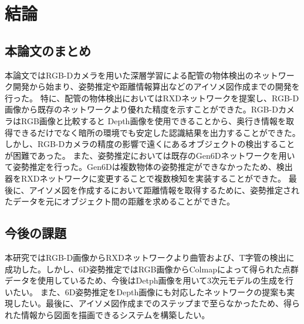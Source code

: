 ﻿\chapter{%
結論}

\section{本論文のまとめ}
本論文ではRGB-Dカメラを用いた深層学習による配管の物体検出のネットワーク開発から始まり、姿勢推定や距離情報算出などのアイソメ図作成までの開発を行った。
特に、配管の物体検出においてはRXDネットワークを提案し、RGB-D画像から既存のネットワークより優れた精度を示すことができた。RGB-DカメラはRGB画像と比較すると
Depth画像を使用できることから、奥行き情報を取得できるだけでなく暗所の環境でも安定した認識結果を出力することができた。しかし、RGB-Dカメラの精度の影響で遠くにあるオブジェクトの検出することが困難であった。
また、姿勢推定においては既存のGen6Dネットワークを用いて姿勢推定を行った。Gen6Dは複数物体の姿勢推定ができなかったため、検出器をRXDネットワークに変更することで複数検知を実装することができた。
最後に、アイソメ図を作成するにおいて距離情報を取得するために、姿勢推定されたデータを元にオブジェクト間の距離を求めることができた。

\section{今後の課題}
本研究ではRGB-D画像からRXDネットワークより曲管および、T字管の検出に成功した。しかし、6D姿勢推定ではRGB画像からColmapによって得られた点群データを使用しているため、今後はDetph画像を用いて3次元モデルの生成を行いたい。
また、6D姿勢推定をDepth画像にも対応したネットワークの提案も実現したい。最後に、アイソメ図作成までのステップまで至らなかったため、得られた情報から図面を描画できるシステムを構築したい。